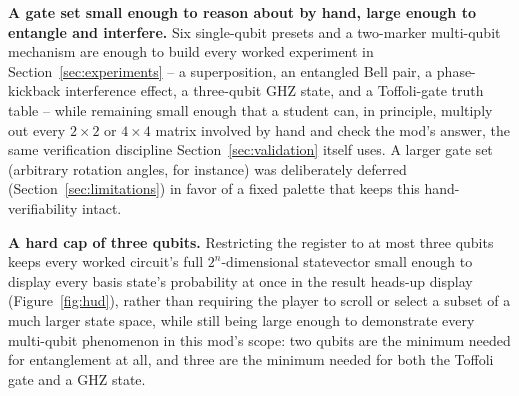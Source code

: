 \textbf{A gate set small enough to reason about by hand, large enough to entangle and
interfere.} Six single-qubit presets and a two-marker multi-qubit mechanism are enough to
build every worked experiment in Section~\ref{sec:experiments} -- a superposition, an
entangled Bell pair, a phase-kickback interference effect, a three-qubit GHZ state, and a
Toffoli-gate truth table -- while remaining small enough that a student can, in principle,
multiply out every $2\times2$ or $4\times4$ matrix involved by hand and check the mod's
answer, the same verification discipline Section~\ref{sec:validation} itself uses. A larger
gate set (arbitrary rotation angles, for instance) was deliberately deferred
(Section~\ref{sec:limitations}) in favor of a fixed palette that keeps this hand-verifiability
intact.

\textbf{A hard cap of three qubits.} Restricting the register to at most three qubits keeps
every worked circuit's full $2^n$-dimensional statevector small enough to display every basis
state's probability at once in the result heads-up display (Figure~\ref{fig:hud}), rather than
requiring the player to scroll or select a subset of a much larger state space, while still
being large enough to demonstrate every multi-qubit phenomenon in this mod's scope: two
qubits are the minimum needed for entanglement at all, and three are the minimum needed for
both the Toffoli gate and a GHZ state.

